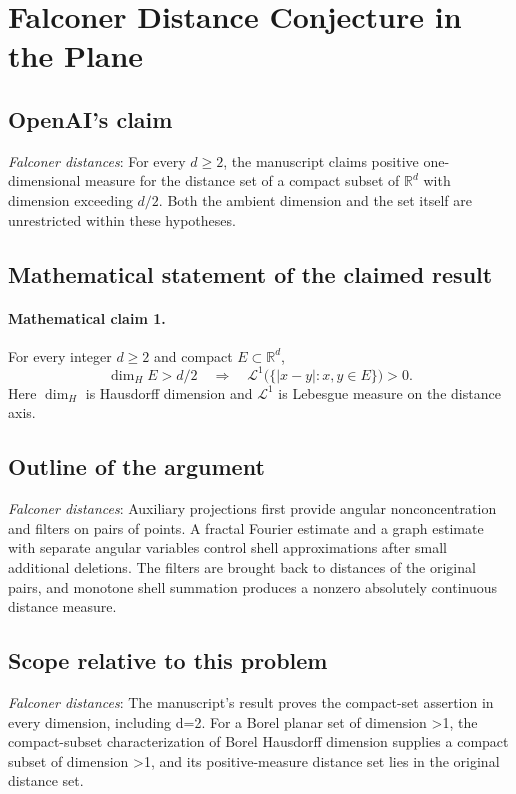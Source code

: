 \documentclass[11pt]{article}
\begin{document}
\section*{Falconer Distance Conjecture in the Plane}

\subsection{OpenAI's claim}
\textit{Falconer distances}: For every $d\ge2$, the manuscript claims positive one-dimensional measure for the distance set of a compact subset of $\mathbb R^d$ with dimension exceeding $d/2$. Both the ambient dimension and the set itself are unrestricted within these hypotheses.

\subsection{Mathematical statement of the claimed result}
\paragraph{Mathematical claim 1.} For every integer $d\ge2$ and compact $E\subset\mathbb R^d$, \[\dim_H E>d/2\quad\Longrightarrow\quad\mathcal L^1\bigl(\{|x-y|:x,y\in E\}\bigr)>0.\] Here $\dim_H$ is Hausdorff dimension and $\mathcal L^1$ is Lebesgue measure on the distance axis.

\subsection{Outline of the argument}
\textit{Falconer distances}: Auxiliary projections first provide angular nonconcentration and filters on pairs of points. A fractal Fourier estimate and a graph estimate with separate angular variables control shell approximations after small additional deletions. The filters are brought back to distances of the original pairs, and monotone shell summation produces a nonzero absolutely continuous distance measure.

\subsection{Scope relative to this problem}
\textit{Falconer distances}: The manuscript’s result proves the compact-set assertion in every dimension, including d=2. For a Borel planar set of dimension >1, the compact-subset characterization of Borel Hausdorff dimension supplies a compact subset of dimension >1, and its positive-measure distance set lies in the original distance set.
\end{document}
